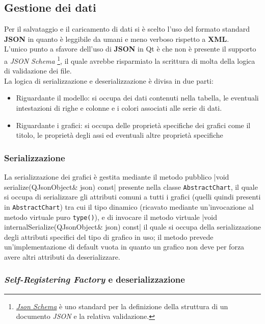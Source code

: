 \subsection{Gestione dei dati}
\label{sec:dataHandling}
Per il salvataggio e il caricamento di dati si è scelto l'uso del formato standard \textbf{JSON} in quanto è leggibile
da umani e meno verboso rispetto a \textbf{XML}.\\
L'unico punto a sfavore dell'uso di \textbf{JSON} in Qt è che non è presente il supporto a \textit{JSON Schema} \footnote{
    \href{https://json-schema.org/}{\textit{Json Schema}} è uno standard per la definizione della struttura di un
    documento \textit{JSON} e la relativa validazione.
}, il quale avrebbe risparmiato la scrittura di molta della logica di validazione dei file.\\
La logica di serializzazione e deserializzazione è divisa in due parti:
\begin{itemize}
    \item Riguardante il modello: si occupa dei dati contenuti nella tabella, le eventuali intestazioni di righe e
          colonne e i colori associati alle serie di dati.
    \item Riguardante i grafici: si occupa delle proprietà specifiche dei grafici come il titolo, le proprietà degli
          assi ed eventuali altre proprietà specifiche
\end{itemize}

\subsubsection{Serializzazione}
\label{subsec:dynamicType}
La serializzazione dei grafici è gestita mediante il metodo pubblico
|void serialize(QJsonObject& json) const|
presente nella classe \texttt{AbstractChart}, il quale si occupa di serializzare gli attributi comuni a tutti
i grafici (quelli quindi presenti in \texttt{AbstractChart}) tra cui il tipo dinamico (ricavato mediante un'invocazione
al metodo virtuale puro \texttt{type()}), e di invocare il metodo virtuale
|void internalSerialize(QJsonObject& json) const|
il quale si occupa della serializzazione degli attributi specifici del tipo di grafico in uso;
il metodo prevede un'implementazione di default vuota in quanto un grafico non deve per forza avere altri attributi da
deserializzare.

\subsubsection{\textit{Self-Registering Factory} e deserializzazione}
\label{subsec:factory}

